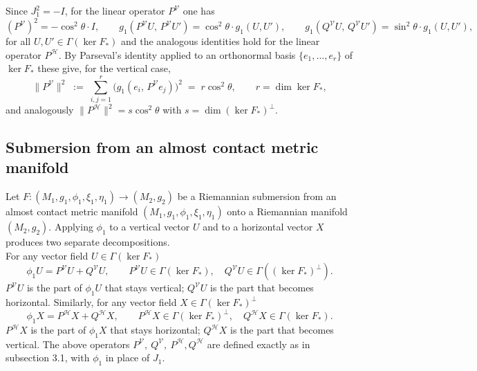 \documentclass[11pt]{amsart}
\theoremstyle{plain}
\theoremstyle{definition}
\theoremstyle{remark}
\begin{document}
Since $J_1^2=-I$, for the linear operator $P^{\mathcal V}$ one has
\begin{equation}\label{eq:ids_subm_hermitian}
  (P^{\mathcal{V}})^2 = -\cos^2\!\theta\cdot I,\qquad
  g_1(P^{\mathcal{V}}U,\,P^{\mathcal{V}}U')
    = \cos^2\!\theta\cdot g_1(U,U'),\qquad
  g_1(Q^{\mathcal{V}}U,\,Q^{\mathcal{V}}U')
    = \sin^2\!\theta\cdot g_1(U,U'),
\end{equation}
for all $U,U'\in\Gamma(\ker F_*)$ and the analogous identities hold for the
linear operator $P^{\mathcal H}$. By Parseval's identity applied to an
orthonormal basis $\{e_1,\ldots,e_r\}$ of $\ker F_*$ these give, for the
{vertical} case,
\begin{equation}\label{eq:P_norm_slant_subm_hermitian}
  \|P^{\mathcal{V}}\|^2
  \;:=\;\sum_{i,j=1}^{r}
    \bigl(g_1(e_i,\,P^{\mathcal{V}}e_j)\bigr)^2
  \;=\; r\cos^2\theta,
  \qquad r=\dim\ker F_*,
\end{equation}
and analogously $\|P^{\mathcal{H}}\|^2=s\cos^2\theta$ with $s=\dim(\ker F_*)^\perp$.

\subsection{Submersion from an almost contact metric manifold}

Let $F:(M_1,g_1,\phi_1,\xi_1,\eta_1)\to(M_2,g_2)$ be a Riemannian submersion from an almost contact metric manifold $(M_1,g_1,\phi_1,\xi_1,\eta_1)$  onto a Riemannian manifold $(M_2,g_2)$. Applying $\phi_1$ to a vertical vector
$U$ and to a horizontal vector $X$ produces two separate
decompositions.\\

For any vector field $U\in\Gamma(\ker F_*)$
\begin{equation}\label{eq:phi1_decomp_V}
  \phi_1 U
  = P^{\mathcal{V}}U + Q^{\mathcal{V}}U,\qquad
  P^{\mathcal{V}}U\in\Gamma(\ker F_*),\quad
  Q^{\mathcal{V}}U\in\Gamma((\ker F_*)^{\perp}).
\end{equation}
$P^{\mathcal{V}}U$ is the part of $\phi_1 U$ that stays
vertical; $Q^{\mathcal{V}}U$ is the part that becomes
horizontal. Similarly, for any vector field $X\in\Gamma(\ker F_*)^{\perp}$
\begin{equation}\label{eq:phi1_decomp_H}
  \phi_1 X
  = P^{\mathcal{H}}X + Q^{\mathcal{H}}X,\qquad
  P^{\mathcal{H}}X\in\Gamma(\ker F_*)^{\perp},\quad
  Q^{\mathcal{H}}X\in\Gamma(\ker F_*).
\end{equation}
$P^{\mathcal{H}}X$ is the part of $\phi_1 X$ that stays
horizontal; $Q^{\mathcal{H}}X$ is the part that becomes
vertical. The above operators $P^{\mathcal{V}},~ Q^{\mathcal{V}},~P^{\mathcal{H}}, Q^{\mathcal{H}}$ are defined exactly as in subsection 3.1, with $\phi_1$ in place of
$J_1$.
\medskip
\end{document}
